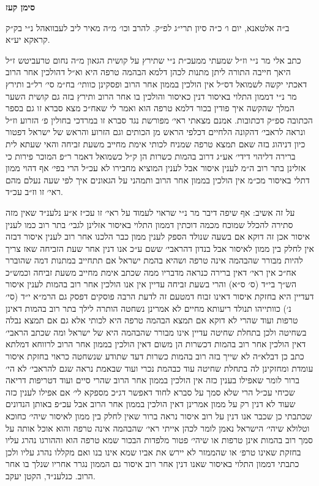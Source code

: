\documentclass[12pt, openany]{book}
\newcommand{\chapname}{}
\newcommand{\newchap}[1]{
	\addcontentsline{toc}{chapter}{#1}
	\renewcommand{\chapname}{#1}
		\begin{center}
			\textbf{%
\fontsize{16pt}{16pt}\selectfont
				#1}
		\end{center}
}
\begin{document}
\newchap{סימן קעז}
\begin{multicols}{2}
ב״ה אלטאנא, יום ו׳ כ״ה סיון תרי״ג לפ״ק. להרב וכו׳ מ״ה מאיר ליב לעבוואהל נ״י בק״ק קראקא יע״א.\\\vspace{0pt}

כתב אלי מר נ״י וז״ל שמעתי ממעכ״ת נ״י שתירץ על קושית הגאון מ״ה נחום טרעביטש ז״ל היאך חייבה התורה ליתן מתנות לכהן דלמא הבהמה טרפה היא וא״ל דהולכין אחר הרוב דאכתי יקשה לשמואל דס״ל אין הולכין בממון אחר הרוב ופסקינן כוותי׳ בח״מ סי׳ רל״ב ותירץ מר נ״י דממון התלוי באיסור דנין כאיסור והולכין בו אחר הרוב ותירץ בזה גם קושית השער המלך שהקשה איך פודין בכור דלמא טרפה הוא ואמר לי שאח״כ מצא סברא זו גם בספר הכתובה ספ״ק דכתובות. אמנם מצאתי ראי׳ מפורשת נגד סברא זו במרדכי בחולין פ׳ הזרוע וז״ל ונראה לראבי׳ דהקונה הלחיים דכלפי הראש מן הכותים וגם הזרוע והראש של ישראל דפטור כיון דניהוג בזה שאם תמצא טרפה שמניח לכותי אימת מחייב משעת זביחה והאי שעתא לית ברירה דליהוי דידי׳ אע״ג דרוב בהמות כשרות הן ק״ל כשמואל דאמר ר״פ המוכר פירות כי אזלינן בתר רוב ה״מ לענין איסור אבל לענין המוציא מחבירו לא עכ״ל הרי בפי׳ אף דהוי ממון דתלי באיסור מכ״מ אין הולכין בממון אחר הרוב ותמהני על הגאונים איך לפי שעה נעלם מהם ראי׳ זו וז״ב עכ״ד.\\\vspace{0pt}

על זה אשיב: אף שיפה דיבר מר נ״י שראוי לעמוד על ראי׳ זו עכ״ז א״ע נלענ״ד שאין מזה סתירה להכלל שמוכח מכמה דוכתין דממון התלוי באיסור אזלינן לגבי׳ בתר רוב כמו לענין איסור אכן זה דוקא אם בשעה שנולד הספק לענין ממון כבר הלכנו אחר רוב לענין איסור דבזה אין לחלק בין ממון לאיסור אבל בנדון דהראבי׳ ששם ע״כ אנו דנין אחר שעת הזביחה שאז צריך להיות מבורר שהבהמה אינה טרפה ושהיא בהמת ישראל אם תתחייב במתנות דמה שהוברר אח״כ אין ראי׳ דאין ברירה כנראה מדבריו ממה שכתב אימת מחייב משעת זביחה וכמש״כ הש״ך בי״ד (ס׳ ס״א) והרי בשעת זביחה עדיין אין אנו הולכין אחר רוב בהמות לענין איסור דעדיין היא בחזקת איסור דאינו זבוח דמטעם זה לדעת הרבה פוסקים דפסק גם הרמ״א י״ד (סי׳ נ׳) כוותייהו תנולד ריעותא מחיים לא אמרינן נשחטה הותרה לילך בתר רוב בהמות דאינן טרפות ועוד שהרי לא דוקא אם תמצא הבהמה טרפה היא לכותי אלא גם אם תמצא נבלה בשחיטה ולכן בתחלת שחיטה עדיין אינו מבורר שהבהמה היא של ישראל ומה שכתב הראבי׳ דאין הולכין אחר רוב בהמות דכשרות הן משום דאין הולכין בממון אחר הרוב לרווחא דמלתא כתב כן דבלא״ה לא שייך בזה רוב בהמות כשרות דעד שתודע שנשחטה כראוי בחזקת איסור עומדת ומחזקינן לה בתחלת שחיטה עוד כבהמת נכרי ועוד שבאמת נראה שגם להראבי׳ לא הי׳ ברור לומר שאפילו בענין כזה אין הולכין בממון אחר הרוב שהרי סיים ועוד דטריפות דריאה שכיחי עכ״ל הרי שלא סמך על סברא לחוד דאפשר דג״כ מספקא לי׳ אם אפילו לענין כזה שעוד לא דנין רק על ממון אמרינן דאין הולכין בממון אחר הרוב אבל עכ״פ באותן הנדונים שכתבתי כן שכבר אנו דנין על רוב איסור נראה ברור שאין לחלק בין ממון לאיסור שיהי׳ כחוכא וטלולא שיהי׳ הישראל נאמן לומר לכהן אייתי ראי׳ שהבהמה אינה טרפה והוא אוכל אותה על סמך רוב בהמות אינן טרפות או שיהי׳ פטור מלפדות הבכור שמא טרפה הוא וההורגו נהרג עליו בחזקת שאינו טרפ׳ או שהממזר לא יירש את אביו שמא אינו בנו ואם מקללו נהרג עליו ולכן כתבתי דממון התלוי באיסור שאנו דנין אחר רוב איסור גם הממון נגרר אחריו שנלך בו אחר הרוב. כנלענ״ד, הקטן יעקב.\\\vspace{0pt}

\end{multicols}\newpage
\end{document}
